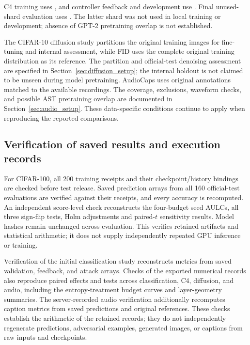 \documentclass[10pt,a4paper,twocolumn]{article}
\begin{document}
C4 training uses , and controller
feedback and development use
. Final unused-shard
evaluation uses .
The latter shard was not used in local training or development; absence
of GPT-2 pretraining overlap is not established.

The CIFAR-10 diffusion study partitions the original training images
for fine-tuning and internal assessment, while FID uses the complete
original training distribution as its reference. The partition and
official-test denoising assessment are specified in
Section~\ref{sec:diffusion_setup}; the internal holdout is not claimed
to be unseen during model pretraining. AudioCaps uses original
annotations matched to the available 
recordings. The coverage, exclusions, waveform checks, and possible
AST pretraining overlap are documented in Section~\ref{sec:audio_setup}.
These data-specific conditions continue to apply when reproducing the
reported comparisons.

\subsection{Verification of saved results and execution records}
\label{app:record_verification}

For CIFAR-100, all 200 training receipts and their checkpoint/history
bindings are checked before test release. Saved prediction arrays from
all 160 official-test evaluations are verified against their receipts,
and every accuracy is recomputed. An independent score-level check
reconstructs the four-budget seed AULCs, all three sign-flip tests,
Holm adjustments and paired-$t$ sensitivity results. Model hashes remain
unchanged across evaluation. This verifies retained artifacts and
statistical arithmetic; it does not supply independently repeated GPU
inference or training.

Verification of the initial classification study reconstructs
metrics from saved validation, feedback, and attack arrays. Checks of
the exported numerical records also reproduce paired effects and tests
across classification, C4, diffusion, and audio, including the
entropy-treatment budget curves and layer-geometry summaries. The
server-recorded audio verification additionally recomputes caption metrics
from saved predictions and original references. These checks establish
the arithmetic of the retained records; they do not independently
regenerate predictions, adversarial examples, generated images, or
captions from raw inputs and checkpoints.
\end{document}
